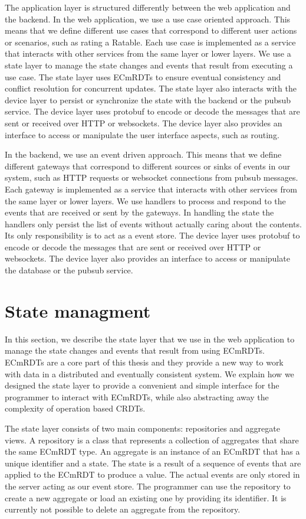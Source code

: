 \documentclass[
	ngerman,
	ruledheaders=section,   %
	class=report,		    %
	thesis={type=bachelor}, %
	accentcolor=9c,			%
	custommargins=true,    %
	marginpar=false,        %
	parskip=half-,          %
	fontsize=11pt,          %
]{tudapub}
\begin{document}
The application layer is structured differently between the web application and the backend. In the web application, we use a use case oriented approach. This means that we define different use cases that correspond to different user actions or scenarios, such as rating a Ratable. Each use case is implemented as a service that interacts with other services from the same layer or lower layers. We use a state layer to manage the state changes and events that result from executing a use case. The state layer uses ECmRDTs to ensure eventual consistency and conflict resolution for concurrent updates. The state layer also interacts with the device layer to persist or synchronize the state with the backend or the pubsub service. The device layer uses protobuf to encode or decode the messages that are sent or received over HTTP or websockets. The device layer also provides an interface to access or manipulate the user interface aspects, such as routing.

In the backend, we use an event driven approach. This means that we define different gateways that correspond to different sources or sinks of events in our system, such as HTTP requests or websocket connections from pubsub messages. Each gateway is implemented as a service that interacts with other services from the same layer or lower layers. We use handlers to process and respond to the events that are received or sent by the gateways. In handling the state the handlers only persist the list of events without actually caring about the contents. Its only responsibility is to act as a event store. The device layer uses protobuf to encode or decode the messages that are sent or received over HTTP or websockets. The device layer also provides an interface to access or manipulate the database or the pubsub service.

\section{State managment}
In this section, we describe the state layer that we use in the web application to manage the state changes and events that result from using ECmRDTs. ECmRDTs are a core part of this thesis and they provide a new way to work with data in a distributed and eventually consistent system. We explain how we designed the state layer to provide a convenient and simple interface for the programmer to interact with ECmRDTs, while also abstracting away the complexity of operation based CRDTs.

The state layer consists of two main components: repositories and aggregate views. A repository is a class that represents a collection of aggregates that share the same ECmRDT type. An aggregate is an instance of an ECmRDT that has a unique identifier and a state. The state is a result of a sequence of events that are applied to the ECmRDT to produce a value. The actual events are only stored in the server acting as our event store. The programmer can use the repository to create a new aggregate or load an existing one by providing its identifier. It is currently not possible to delete an aggregate from the repository.
\end{document}
